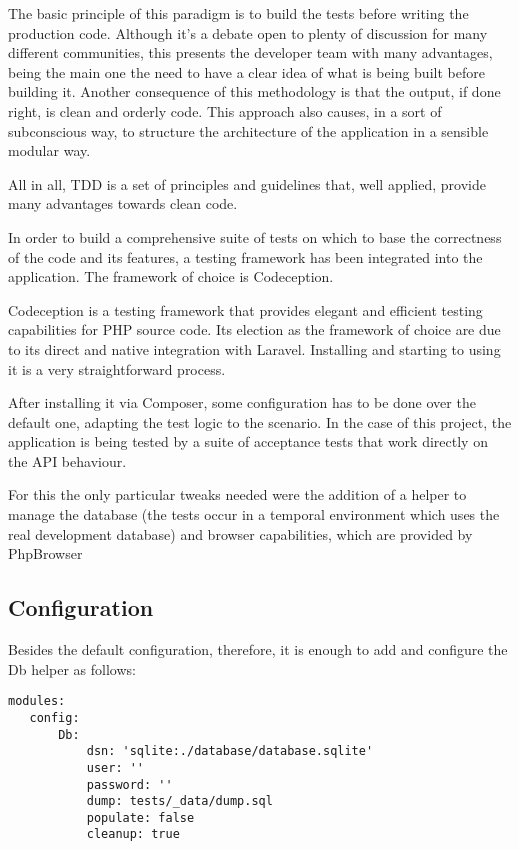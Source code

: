 The basic principle of this paradigm is to build the tests before writing the production code. Although it’s a debate open to plenty of discussion for many different communities, this presents the developer team with many advantages, being the main one the need to have a clear idea of what is being built before building it. Another consequence of this methodology is that the output, if done right, is clean and orderly code. This approach also causes, in a sort of subconscious way, to structure the architecture of the application in a sensible modular way. 

All in all, TDD is a set of principles and guidelines that, well applied, provide many advantages towards clean code.

In order to build a comprehensive suite of tests on which to base the correctness of the code and its features, a testing framework has been integrated into the application.  The framework of choice is Codeception.

Codeception is a testing framework that provides elegant and efficient testing capabilities for PHP source code. Its election as the framework of choice are due to its direct and native integration with Laravel. Installing and starting to using it is a very straightforward process.

After installing it via Composer, some configuration has to be done over the default one, adapting the test logic to the scenario. In the case of this project, the application is being tested by a suite of acceptance tests that work directly on the API behaviour.

For this the only particular tweaks needed were the addition of a helper to manage the database (the tests occur in a temporal environment which uses the real development database) and browser capabilities, which are provided by PhpBrowser

\subsection{Configuration}
Besides the default configuration, therefore, it is enough to add and configure the Db helper as follows:

\begin{verbatim}
modules:
   config:
       Db:
           dsn: 'sqlite:./database/database.sqlite'
           user: ''
           password: ''
           dump: tests/_data/dump.sql
           populate: false
           cleanup: true
\end{verbatim}

